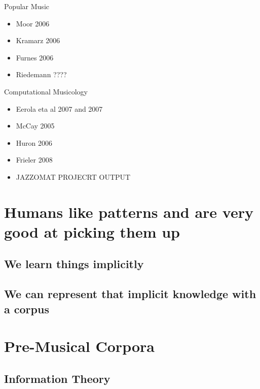 \documentclass[]{book}
\providecommand{\tightlist}{%
  \setlength{\itemsep}{0pt}\setlength{\parskip}{0pt}}
\theoremstyle{definition}
\theoremstyle{definition}
\theoremstyle{definition}
\theoremstyle{remark}
\begin{document}
Popular Music

\begin{itemize}
\tightlist
\item
  Moor 2006
\item
  Kramarz 2006
\item
  Furnes 2006
\item
  Riedemann ????
\end{itemize}

Computational Musicology

\begin{itemize}
\tightlist
\item
  Eerola eta al 2007 and 2007
\item
  McCay 2005
\item
  Huron 2006
\item
  Frieler 2008
\item
  JAZZOMAT PROJECRT OUTPUT
\end{itemize}

\hypertarget{humans-like-patterns-and-are-very-good-at-picking-them-up}{%
\section{Humans like patterns and are very good at picking them
up}\label{humans-like-patterns-and-are-very-good-at-picking-them-up}}

\hypertarget{we-learn-things-implicitly}{%
\subsection{We learn things
implicitly}\label{we-learn-things-implicitly}}

\hypertarget{we-can-represent-that-implicit-knowledge-with-a-corpus}{%
\subsection{We can represent that implicit knowledge with a
corpus}\label{we-can-represent-that-implicit-knowledge-with-a-corpus}}

\hypertarget{pre-musical-corpora}{%
\section{Pre-Musical Corpora}\label{pre-musical-corpora}}

\hypertarget{information-theory}{%
\subsection{Information Theory}\label{information-theory}}
\end{document}
